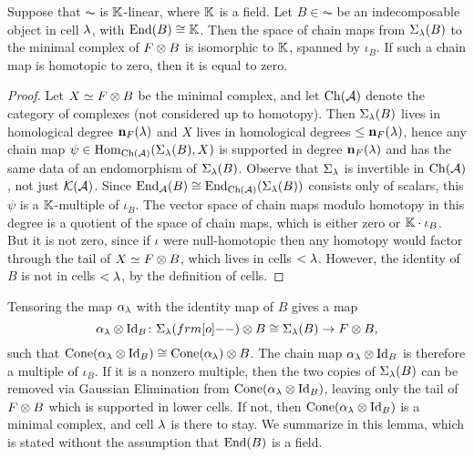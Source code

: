\begin{lemma} \label{lemma:onlyiota}
Suppose that $\AC$ is ${\mathbb{K}}$-linear, where ${\mathbb{K}}$ is a field.  Let $B\in \AC$ be an indecomposable object in cell $\lambda$, with $\operatorname{End}(B)\cong {\mathbb{K}}$.  Then the space of chain maps from $\Sigma_\lambda(B)$ to the minimal complex of $F \otimes B$ is isomorphic to ${\mathbb{K}}$, spanned by $\iota_B$.  If such a chain map is homotopic to zero, then it is equal to zero.
\end{lemma}



\begin{proof} Let $X\simeq F\otimes B$ be the minimal complex, and let $\operatorname{Ch}({\mathcal{A}})$ denote the category of complexes (not considered up to homotopy).  Then $\Sigma_\lambda(B)$ lives in homological degree ${\mathbf n}_F(\lambda)$ and $X$ lives in homological degrees $\leq {\mathbf n}_F(\lambda)$, hence any chain map $\psi\in \operatorname{Hom}_{\operatorname{Ch}({\mathcal{A}})}(\Sigma_\lambda(B), X)$ is supported in degree ${\mathbf n}_F(\lambda)$ and has the same data of an endomorphism of $\Sigma_\lambda(B)$.  Observe that $\Sigma_\lambda$ is invertible in $\operatorname{Ch}({\mathcal{A}})$, not just ${{\mathcal{K}}}({\mathcal{A}})$.  Since $\operatorname{End}_{{\mathcal{A}}}(B) \cong \operatorname{End}_{\operatorname{Ch}({\mathcal{A}})}(\Sigma_\lambda(B))$ consists only of scalars, this $\psi$ is a ${\mathbb{K}}$-multiple of $\iota_B$.  The vector space of chain maps modulo homotopy in this degree is a quotient of the space of chain maps, which is either zero or ${\mathbb{K}}\cdot \iota_B$.  But it is not zero, since if $\iota$ were null-homotopic then any homotopy would factor through the tail of $X\simeq F \otimes B$, which lives in cells $<\lambda$. However, the identity of $B$ is not in cells $< \lambda$, by the definition of cells. \end{proof}


Tensoring the map $\alpha_\lambda$ with the identity map of $B$ gives a map
\[
\a_\l \ot \Id_B \co \Sigma_\l(\one)\otimes B\cong \Sigma_\l(B) \rightarrow F\otimes B,
\]
such that $\operatorname{Cone}(\alpha_\lambda \otimes \operatorname{Id}_B) \cong \operatorname{Cone}(\alpha_\lambda)\otimes B$. The chain map $\alpha_\lambda \otimes \operatorname{Id}_B$ is therefore a multiple of $\iota_B$. If it is a nonzero multiple, then the two copies of $\Sigma_\lambda(B)$ can be removed via Gaussian Elimination from $\operatorname{Cone}(\alpha_\lambda \otimes \operatorname{Id}_B)$, leaving only the tail of $F \otimes B$ which is supported in lower cells. If not, then $\operatorname{Cone}(\alpha_\lambda \otimes \operatorname{Id}_B)$ is a minimal complex, and cell $\lambda$ is there to stay. We summarize in this lemma, which is stated without the assumption that $\operatorname{End}(B)$ is a field.

